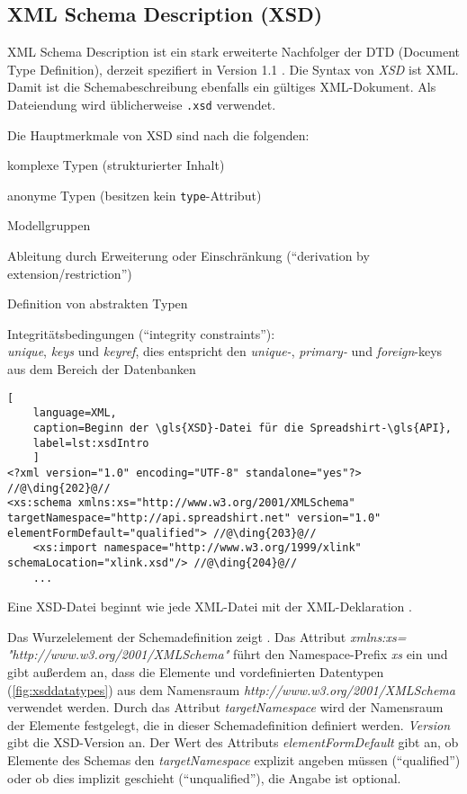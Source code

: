 \subsection{XML Schema Description (XSD)}
\label{sec:xsd}

\textsc{XML} Schema Description ist ein stark erweiterte Nachfolger der \gls{DTD} (Document Type Definition), derzeit spezifiert in Version 1.1 \cite{XMLSchema11Specification}. 
Die Syntax von \emph{\gls{XSD}} ist \gls{XML}. Damit ist die Schemabeschreibung ebenfalls ein gültiges \gls{XML}-Dokument. Als Dateiendung wird üblicherweise \texttt{.xsd} verwendet.

Die Hauptmerkmale von \gls{XSD} sind nach \cite[Kapitel 3.2][]{taxonomyXMLSchema} die folgenden:
\begin{compactitem}
    \item komplexe Typen (strukturierter Inhalt)
    \item anonyme Typen (besitzen kein \texttt{type}-Attribut)
    \item Modellgruppen
    \item Ableitung durch Erweiterung oder Einschränkung (\enquote{derivation by extension/restriction})
    \item Definition von abstrakten Typen
    \item Integritätsbedingungen (\enquote{integrity constraints}):\\
        \emph{unique}, \emph{keys} und \emph{keyref}, dies entspricht den \emph{unique-}, \emph{primary-} und \emph{foreign}-keys aus dem Bereich der Datenbanken        
\end{compactitem}

\begin{lstlisting}[
    language=XML,
    caption=Beginn der \gls{XSD}-Datei für die Spreadshirt-\gls{API},
    label=lst:xsdIntro
    ]
<?xml version="1.0" encoding="UTF-8" standalone="yes"?> //@\ding{202}@//
<xs:schema xmlns:xs="http://www.w3.org/2001/XMLSchema"  targetNamespace="http://api.spreadshirt.net" version="1.0" elementFormDefault="qualified"> //@\ding{203}@//
    <xs:import namespace="http://www.w3.org/1999/xlink" schemaLocation="xlink.xsd"/> //@\ding{204}@//
    ...
\end{lstlisting}

Eine \gls{XSD}-Datei beginnt wie jede \gls{XML}-Datei mit der \gls{XML}-Deklaration .

Das Wurzelelement der Schemadefinition zeigt . 
Das Attribut \emph{xmlns:xs= "http://www.w3.org/2001/XMLSchema"} führt den Namespace-Prefix \emph{xs} ein und gibt außerdem an, dass die Elemente und vordefinierten Datentypen (\cref{fig:xsddatatypes}) aus dem Namensraum \emph{http://www.w3.org/2001/XMLSchema} verwendet werden. Durch das Attribut \emph{targetNamespace} wird der Namensraum der Elemente festgelegt, die in dieser Schemadefinition definiert werden. \emph{Version} gibt die \gls{XSD}-Version an.
Der Wert des Attributs \emph{elementFormDefault} gibt an, ob Elemente des Schemas den \emph{targetNamespace} explizit angeben müssen (\enquote{qualified}) oder ob dies implizit geschieht (\enquote{unqualified}), die Angabe ist optional.

